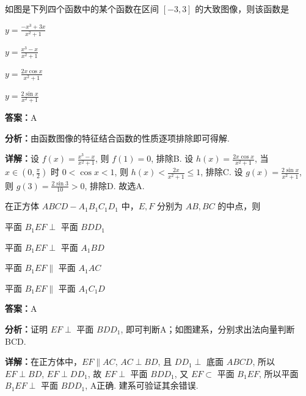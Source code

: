 \begin{question}[points=5]
如图是下列四个函数中的某个函数在区间 $[-3,3]$ 的大致图像，则该函数是
\begin{choices}
  \item $y=\frac{-x^3+3x}{x^2+1}$
  \item $y=\frac{x^3-x}{x^2+1}$
  \item $y=\frac{2x\cos x}{x^2+1}$
  \item $y=\frac{2\sin x}{x^2+1}$
\end{choices}
\begin{solution}
\textbf{答案：}A

\textbf{分析：}由函数图像的特征结合函数的性质逐项排除即可得解.

\textbf{详解：}设 $f(x)=\frac{x^3-x}{x^2+1}$, 则 $f(1)=0$, 排除B. 设 $h(x)=\frac{2x\cos x}{x^2+1}$, 当 $x\in(0,\frac{\pi}{2})$ 时 $0<\cos x<1$, 则 $h(x)<\frac{2x}{x^2+1}\le 1$, 排除C. 设 $g(x)=\frac{2\sin x}{x^2+1}$, 则 $g(3)=\frac{2\sin3}{10}>0$, 排除D. 故选A.
\end{solution}
\end{question}

\begin{question}[points=5]
在正方体 $ABCD-A_1B_1C_1D_1$ 中，$E,F$ 分别为 $AB, BC$ 的中点，则
\begin{choices}
  \item 平面 $B_1EF \perp$ 平面 $BDD_1$
  \item 平面 $B_1EF \perp$ 平面 $A_1BD$
  \item 平面 $B_1EF \parallel$ 平面 $A_1AC$
  \item 平面 $B_1EF \parallel$ 平面 $A_1C_1D$
\end{choices}
\begin{solution}
\textbf{答案：}A

\textbf{分析：}证明 $EF \perp$ 平面 $BDD_1$, 即可判断A；如图建系，分别求出法向量判断BCD.

\textbf{详解：}在正方体中，$EF \parallel AC$, $AC \perp BD$, 且 $DD_1 \perp$ 底面 $ABCD$, 所以 $EF \perp BD$, $EF \perp DD_1$, 故 $EF \perp$ 平面 $BDD_1$, 又 $EF \subset$ 平面 $B_1EF$, 所以平面 $B_1EF \perp$ 平面 $BDD_1$, A正确. 建系可验证其余错误.
\end{solution}
\end{question}

